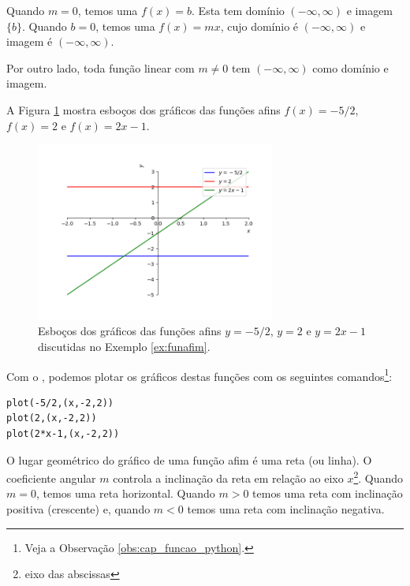 Quando $m=0$, temos uma  $f(x) = b$. Esta tem domínio $(-\infty, \infty)$ e imagem $\{b\}$. Quando $b=0$, temos uma  $f(x)=mx$, cujo domínio é $(-\infty, \infty)$ e imagem é $(-\infty, \infty)$.

Por outro lado, toda função linear com $m\neq 0$ tem $(-\infty, \infty)$ como domínio e imagem.

\begin{ex}\label{ex:funafim}
  A Figura \ref{fig:ex_funafim} mostra esboços dos gráficos das funções afins $f(x)=-5/2$, $f(x)=2$ e $f(x)=2x-1$.
  
  \begin{figure}[H]
    \centering
    \includegraphics[width=0.7\textwidth]{./cap_funcao/dados/fig_ex_funafim/fig_ex_funafim}
    \caption{Esboços dos gráficos das funções afins $y=-5/2$, $y=2$ e $y=2x-1$ discutidas no Exemplo \ref{ex:funafim}.}
    \label{fig:ex_funafim}
  \end{figure}

  \ifispython
  Com o \sympy, podemos plotar os gráficos destas funções com os seguintes comandos\footnote{Veja a Observação \ref{obs:cap_funcao_python}.}:
\begin{verbatim}
plot(-5/2,(x,-2,2))
plot(2,(x,-2,2))
plot(2*x-1,(x,-2,2))
\end{verbatim}
  \fi
\end{ex}

O lugar geométrico do gráfico de uma função afim é uma reta (ou linha). O coeficiente angular $m$ controla a inclinação da reta em relação ao eixo $x$\footnote{eixo das abscissas}. Quando $m=0$, temos uma reta horizontal. Quando $m>0$ temos uma reta com inclinação positiva (crescente) e, quando $m<0$ temos uma reta com inclinação negativa.

